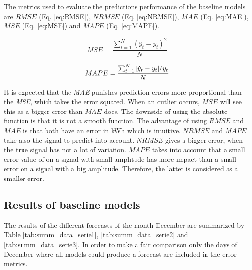 The metrics used to evaluate the predictions performance of the baseline models are $ RMSE $ (Eq. \ref{eq:RMSE}), $ NRMSE $ (Eq. \ref{eq:NRMSE}), $ MAE $ (Eq. \ref{eq:MAE}), $ MSE $ (Eq. \ref{eq:MSE}) and $ MAPE $ (Eq. \ref{eq:MAPE}).

\begin{equation}\label{eq:MSE}
	MSE = \frac{\sum_{t=1}^{N}(\hat{y}_t-y_t)^2}{N}
\end{equation}

\begin{equation}\label{eq:MAPE}
	MAPE = \frac{\sum_{t=1}^{N}\abs{\hat{y}_t-y_t}/y_t}{N}
\end{equation}


It is expected that the \textit{MAE} punishes prediction errors more proportional than the \textit{MSE}, which takes the error squared. When an outlier occurs, $ MSE $ will see this as a bigger error than $ MAE $ does. The downside of using the absolute function is that it is not a smooth function. The advantage of using $ RMSE $ and $ MAE $ is that both have an error in kWh which is intuitive. $ NRMSE $ and $ MAPE $ take also the signal to predict into account. $ NRMSE $ gives a bigger error, when the true signal has not a lot of variation. $ MAPE $ takes into account that a small error value of on a signal with small amplitude has more impact than a small error on a signal with a big amplitude. Therefore, the latter is considered as a smaller error.


\subsection{Results of baseline models}
The results of the different forecasts of the month December are summarized by Table \ref{tab:summ_data_serie1}, \ref{tab:summ_data_serie2} and \ref{tab:summ_data_serie3}. In order to make a fair comparison only the days of December where all models could produce a forecast are included in the error metrics. 

